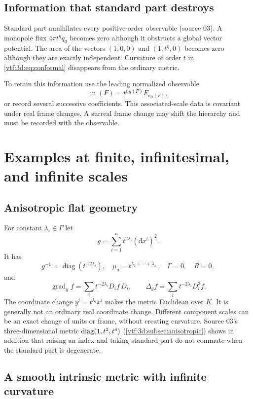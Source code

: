 \documentclass[11pt,letterpaper]{article}
\theoremstyle{definition}
\theoremstyle{remark}
\newcommand{\grad}{\operatorname{grad}}\newcommand{\Div}{\operatorname{div}}
\newcommand{\vH}{v_{\!H}}
\newcommand{\dd}{\mathrm d}
\begin{document}
\subsection{Information that standard part destroys}\label{vtf:3d:subsec:destroys}
Standard part annihilates every positive-order observable (source 03). A monopole flux $4\pi t^\eta q_0$ becomes zero although it obstructs a global vector potential. The area of the vectors $(1,0,0)$ and $(1,t^\eta,0)$ becomes zero although they are exactly independent. Curvature of order $t$ in \eqref{vtf:3d:eq:conformal} disappears from the ordinary metric.

To retain this information use the leading normalized observable
\[
 \operatorname{in}(F)=t^{\vH(F)}F_{\vH(F)},
\]
or record several successive coefficients. This associated-scale data is covariant under real frame changes. A surreal frame change may shift the hierarchy and must be recorded with the observable.

\section{Examples at finite, infinitesimal, and infinite scales}\label{vtf:sec:examples}

\subsection{Anisotropic flat geometry}

For constant $\lambda_i\in\Gamma$ let
\[
 g=\sum_{i=1}^n t^{2\lambda_i}(\dd x^i)^2.
\]
It has
\[
 g^{-1}=\operatorname{diag}(t^{-2\lambda_i}),\quad
 \mu_g=t^{\lambda_1+\cdots+\lambda_n},\quad
 \Gamma=0,\quad R=0,
\]
and
\[
 \grad_g f=\sum_i t^{-2\lambda_i}D_i f\,D_i,
 \qquad \Delta_g f=\sum_i t^{-2\lambda_i}D_i^2f.
\]
The coordinate change $y^i=t^{\lambda_i}x^i$ makes the metric Euclidean
over $K$. It is generally not an ordinary real coordinate change. Different
component scales can be an exact change of units or frame, without creating
curvature. Source 03's three-dimensional metric $\operatorname{diag}(1,t^2,t^4)$
(\cref{vtf:3d:subsec:anisotropic}) shows in addition that raising an index and
taking standard part do not commute when the standard part is degenerate.

\subsection{A smooth intrinsic metric with infinite curvature}\label{vtf:subsec:warped}
\end{document}
